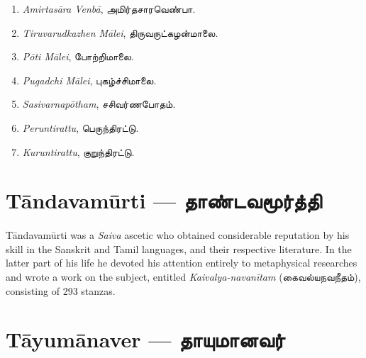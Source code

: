 \documentclass{article}
\newcommand{\TamilText}[1]{\texttamil{#1}}
\newcommand{\TamilBold}[1]{\texttamil{\textbf{#1}}}
\newcommand{\tam}[1]{\TamilText{#1}}
\newcommand{\tambold}[1]{\TamilBold{#1}}
\begin{document}
\begin{enumerate}
    \item \emph{Amirtas\={a}ra Venb\={a}}, \tam{அமிர்தசாரவெண்பா}.

    \item \emph{Tiruvarudkazhen M\={a}lei}, \tam{திருவருட்கழன்மாலை}.

    \item \emph{P\={o}ti M\={a}lei}, \tam{போற்றிமாலை}.

    \item \emph{Pugadchi M\={a}lei}, \tam{புகழ்ச்சிமாலை}.

    \item \emph{Sasivarnap\={o}tham}, \tam{சசிவர்ணபோதம்}.

    \item \emph{Peruntirattu}, \tam{பெருந்திரட்டு}.

    \item \emph{Kuruntirattu}, \tam{குறுந்திரட்டு}.
\end{enumerate}
\section{T\={a}ndavam\={u}rti --- \tambold{தாண்டவமூர்த்தி}}
\paragraph{}
T\={a}ndavam\={u}rti was a \emph{Saiva} ascetic who obtained considerable reputation by his skill in the Sanskrit and Tamil languages, and their respective literature. In the latter part of his life he devoted his attention entirely to metaphysical researches and wrote a work on the subject, entitled \emph{Kaivalya-navan\={i}tam} (\tam{கைவல்யநவநீதம்}), consisting of 293 stanzas.

\section{T\={a}yum\={a}naver --- \tambold{தாயுமானவர்}}
\end{document}
